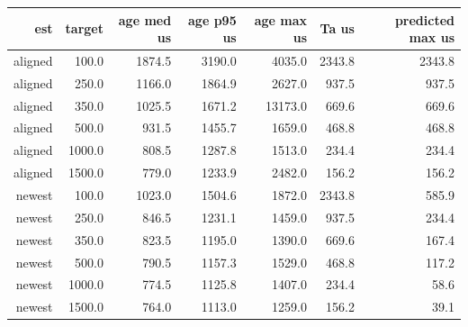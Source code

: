 \begin{tabular}{@{}rrrrrrr@{}}
\toprule
est & target & age med us & age p95 us & age max us & Ta us & predicted max us \\
\midrule
aligned & 100.0 & 1874.5 & 3190.0 & 4035.0 & 2343.8 & 2343.8 \\
aligned & 250.0 & 1166.0 & 1864.9 & 2627.0 & 937.5 & 937.5 \\
aligned & 350.0 & 1025.5 & 1671.2 & 13173.0 & 669.6 & 669.6 \\
aligned & 500.0 & 931.5 & 1455.7 & 1659.0 & 468.8 & 468.8 \\
aligned & 1000.0 & 808.5 & 1287.8 & 1513.0 & 234.4 & 234.4 \\
aligned & 1500.0 & 779.0 & 1233.9 & 2482.0 & 156.2 & 156.2 \\
newest & 100.0 & 1023.0 & 1504.6 & 1872.0 & 2343.8 & 585.9 \\
newest & 250.0 & 846.5 & 1231.1 & 1459.0 & 937.5 & 234.4 \\
newest & 350.0 & 823.5 & 1195.0 & 1390.0 & 669.6 & 167.4 \\
newest & 500.0 & 790.5 & 1157.3 & 1529.0 & 468.8 & 117.2 \\
newest & 1000.0 & 774.5 & 1125.8 & 1407.0 & 234.4 & 58.6 \\
newest & 1500.0 & 764.0 & 1113.0 & 1259.0 & 156.2 & 39.1 \\
\bottomrule
\end{tabular}
